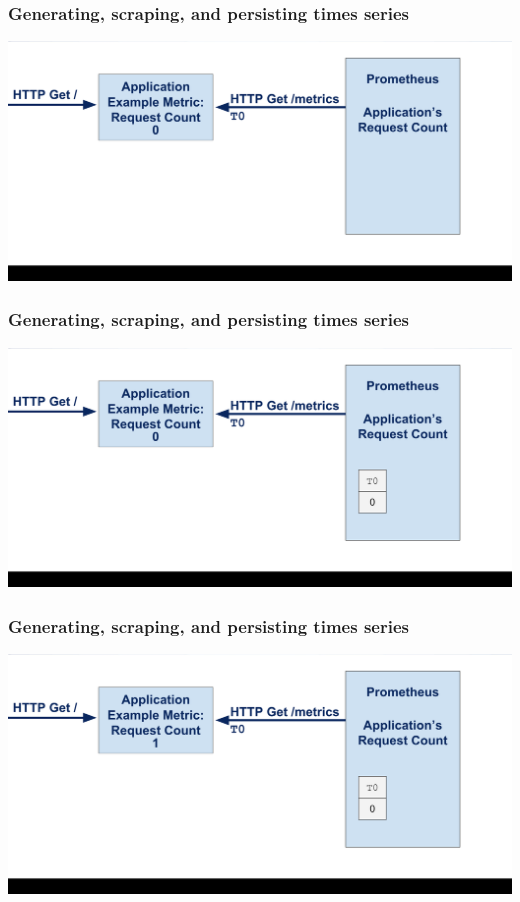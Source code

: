 \documentclass[aspectratio=169]{beamer}
\begin{document}
\begin{frame}
        \frametitle{Generating, scraping, and persisting times series}
        \includegraphics[width=\textwidth]{03-cropped.png}
\end{frame}

\begin{frame}
        \frametitle{Generating, scraping, and persisting times series}
        \includegraphics[width=\textwidth]{04-cropped.png}
\end{frame}

\begin{frame}
        \frametitle{Generating, scraping, and persisting times series}
        \includegraphics[width=\textwidth]{05-cropped.png}
\end{frame}
\end{document}
